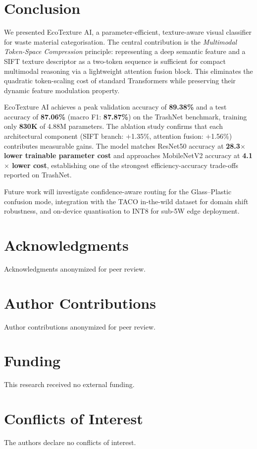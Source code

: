 \documentclass[12pt, a4paper]{article}
\begin{document}
\section{Conclusion}
\label{sec:conclusion}
We presented EcoTexture AI, a parameter-efficient, texture-aware visual classifier for waste material categorisation. The central contribution is the \emph{Multimodal Token-Space Compression} principle: representing a deep semantic feature and a SIFT texture descriptor as a two-token sequence is sufficient for compact multimodal reasoning via a lightweight attention fusion block. This eliminates the quadratic token-scaling cost of standard Transformers while preserving their dynamic feature modulation property.

EcoTexture AI achieves a peak validation accuracy of \textbf{89.38\%} and a test accuracy of \textbf{87.06\%} (macro F1: \textbf{87.87\%}) on the TrashNet benchmark, training only \textbf{830K} of 4.88M parameters. The ablation study confirms that each architectural component (SIFT branch: $+$1.35\%, attention fusion: $+$1.56\%) contributes measurable gains. The model matches ResNet50 accuracy at \textbf{28.3$\times$ lower trainable parameter cost} and approaches MobileNetV2 accuracy at \textbf{4.1$\times$ lower cost}, establishing one of the strongest efficiency-accuracy trade-offs reported on TrashNet.

Future work will investigate confidence-aware routing for the Glass--Plastic confusion mode, integration with the TACO in-the-wild dataset for domain shift robustness, and on-device quantisation to INT8 for sub-5W edge deployment.

\section*{Acknowledgments}
Acknowledgments anonymized for peer review.

\section*{Author Contributions}
Author contributions anonymized for peer review.

\section*{Funding}
This research received no external funding.

\section*{Conflicts of Interest}
The authors declare no conflicts of interest.
\end{document}
